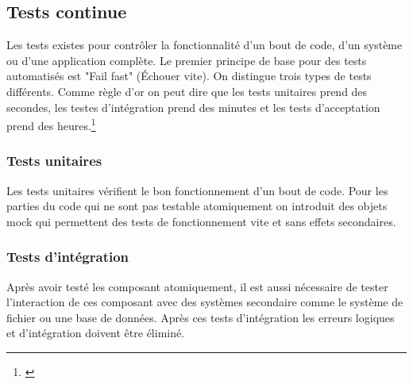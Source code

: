 \subsection{Tests continue}
Les tests existes pour contrôler la fonctionnalité d'un bout de code, d'un système ou d'une application complète. Le premier principe de base pour des tests automatisés est "Fail fast" (Échouer vite). On distingue trois types de tests différents. Comme règle d'or on peut dire que les tests unitaires prend des secondes, les testes d'intégration prend des minutes et les tests d'acceptation prend des heures.\footnote{\citep{artofunittesting}}

\subsubsection{Tests unitaires}
Les tests unitaires vérifient le bon fonctionnement d'un bout de code. Pour les parties du code qui ne sont pas testable atomiquement on introduit des objets mock qui permettent des tests de fonctionnement vite et sans effets secondaires. 
\subsubsection{Tests d'intégration}
Après avoir testé les composant atomiquement, il est aussi nécessaire de tester l'interaction de ces composant avec des systèmes secondaire comme le système de fichier ou une base de données. Après ces tests d'intégration les erreurs logiques et d'intégration doivent être éliminé.
